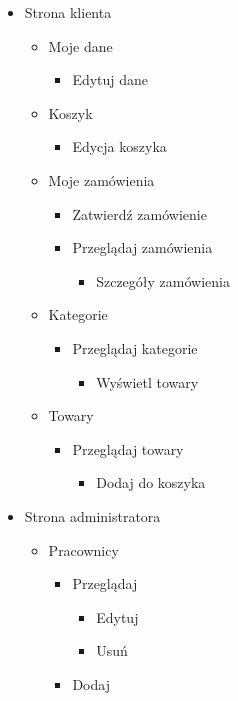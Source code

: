 \documentclass[10pt,a4paper]{article}
\begin{document}
\begin{itemize}
		\item Strona klienta
		\begin{itemize}
		  \item Moje dane
		  \begin{itemize}
		    \item Edytuj dane
		  \end{itemize}
		  \item Koszyk
		  \begin{itemize}
		    \item Edycja koszyka
		  \end{itemize}
		  \item Moje zamówienia
		  \begin{itemize}
		    \item Zatwierdź zamówienie
		    \item Przeglądaj zamówienia
		    \begin{itemize}
		      \item Szczegóły zamówienia
		    \end{itemize}
		  \end{itemize}		         
		  \item Kategorie
		  \begin{itemize}
		    \item Przeglądaj kategorie
		    \begin{itemize}
		      \item Wyświetl towary
		    \end{itemize}
		  \end{itemize}
		  \item Towary
	        \begin{itemize}
              \item Przeglądaj towary
	          \begin{itemize}
		        \item Dodaj do koszyka
	          \end{itemize}
            \end{itemize}
          \end{itemize}
		       
		  \item Strona administratora
		  \begin{itemize}
		    \item Pracownicy
		    \begin{itemize}
		      \item Przeglądaj
		      \begin{itemize}
		        \item Edytuj
		        \item Usuń
		      \end{itemize}
		        \item Dodaj
		    \end{itemize}
		  \end{itemize}
		\end{itemize}
		
\end{document}
